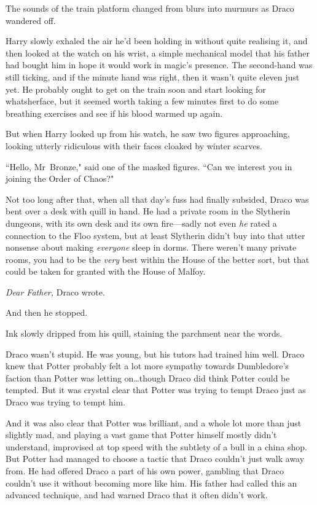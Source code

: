 The sounds of the train platform changed from blurs into murmurs as Draco wandered off.

Harry slowly exhaled the air he'd been holding in without quite realising it, and then looked at the watch on his wrist, a simple mechanical model that his father had bought him in hope it would work in magic's presence. The second-hand was still ticking, and if the minute hand was right, then it wasn't quite eleven just yet. He probably ought to get on the train soon and start looking for whatsherface, but it seemed worth taking a few minutes first to do some breathing exercises and see if his blood warmed up again.

But when Harry looked up from his watch, he saw two figures approaching, looking utterly ridiculous with their faces cloaked by winter scarves.

``Hello, Mr~Bronze," said one of the masked figures. ``Can we interest you in joining the Order of Chaos?"


Not too long after that, when all that day's fuss had finally subsided, Draco was bent over a desk with quill in hand. He had a private room in the Slytherin dungeons, with its own desk and its own fire—sadly not even \emph{he} rated a connection to the Floo system, but at least Slytherin didn't buy into that utter nonsense about making \emph{everyone} sleep in dorms. There weren't many private rooms, you had to be the \emph{very} best within the House of the better sort, but that could be taken for granted with the House of Malfoy.

\emph{Dear Father,} Draco wrote.

And then he stopped.

Ink slowly dripped from his quill, staining the parchment near the words.

Draco wasn't stupid. He was young, but his tutors had trained him well. Draco knew that Potter probably felt a lot more sympathy towards Dumbledore's faction than Potter was letting on…though Draco did think Potter could be tempted. But it was crystal clear that Potter was trying to tempt Draco just as Draco was trying to tempt him.

And it was also clear that Potter was brilliant, and a whole lot more than just slightly mad, and playing a vast game that Potter himself mostly didn't understand, improvised at top speed with the subtlety of a bull in a china shop. But Potter had managed to choose a tactic that Draco couldn't just walk away from. He had offered Draco a part of his own power, gambling that Draco couldn't use it without becoming more like him. His father had called this an advanced technique, and had warned Draco that it often didn't work.

